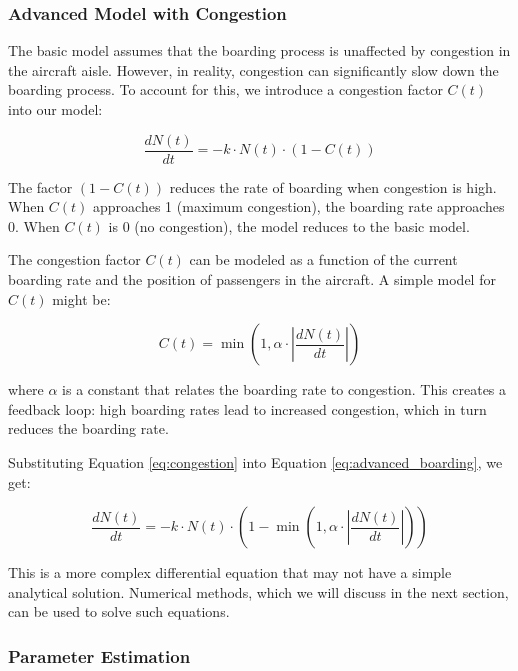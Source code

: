 \documentclass[12pt,a4paper]{article}
\begin{document}
\subsubsection{Advanced Model with Congestion}

The basic model assumes that the boarding process is unaffected by congestion in the aircraft aisle. However, in reality, congestion can significantly slow down the boarding process. To account for this, we introduce a congestion factor $C(t)$ into our model:

\begin{equation}
\frac{dN(t)}{dt} = -k \cdot N(t) \cdot (1 - C(t))
\label{eq:advanced_boarding}
\end{equation}

The factor $(1 - C(t))$ reduces the rate of boarding when congestion is high. When $C(t)$ approaches 1 (maximum congestion), the boarding rate approaches 0. When $C(t)$ is 0 (no congestion), the model reduces to the basic model.

The congestion factor $C(t)$ can be modeled as a function of the current boarding rate and the position of passengers in the aircraft. A simple model for $C(t)$ might be:

\begin{equation}
C(t) = \min\left(1, \alpha \cdot \left| \frac{dN(t)}{dt} \right| \right)
\label{eq:congestion}
\end{equation}

where $\alpha$ is a constant that relates the boarding rate to congestion. This creates a feedback loop: high boarding rates lead to increased congestion, which in turn reduces the boarding rate.

Substituting Equation \ref{eq:congestion} into Equation \ref{eq:advanced_boarding}, we get:

\begin{equation}
\frac{dN(t)}{dt} = -k \cdot N(t) \cdot \left(1 - \min\left(1, \alpha \cdot \left| \frac{dN(t)}{dt} \right| \right) \right)
\label{eq:combined_boarding}
\end{equation}

This is a more complex differential equation that may not have a simple analytical solution. Numerical methods, which we will discuss in the next section, can be used to solve such equations.

\subsubsection{Parameter Estimation}
\end{document}
